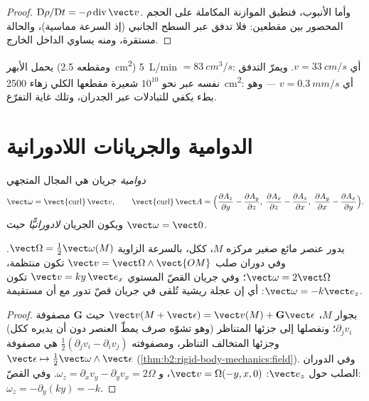 \begin{proof}
$\mathrm D\rho/\mathrm Dt = -\rho\operatorname{div}\vect v$. وأما الأنبوب،
فنطبق الموازنة المكاملة على الحجم المحصور بين مقطعين: فلا تدفق
عبر السطح الجانبي (إذ السرعة مماسية)، والحالة مستقرة، ومنه
يساوي الداخل الخارج.
\end{proof}

\begin{example}[الدم]\label{ex:b2:fluid-kinematics:blood}
يحمل الأبهر (ومقطعه \qty{2.5}{cm^2}) \qty{5}{L/min} $= \qty{83}{cm^3/s}$:
أي $v = \qty{33}{cm/s}$. ويمرّ التدفق نفسه عبر نحو $10^{10}$
شعيرة مقطعها الكلي زهاء \qty{2500}{cm^2}: أي $v = \qty{0.3}{mm/s}$ ---
وهو بطء يكفي للتبادلات عبر الجدران، وتلك غاية التفرّع.
\end{example}

\section{الدوامية والجريانات اللادورانية}

\begin{definition}[الدوامية]\label{def:b2:fluid-kinematics:vorticity}
\emph{دوامية} جريان هي المجال المتجهي
\[
\vect\omega = \operatorname{\vect{curl}}\vect v , \qquad
\operatorname{\vect{curl}}\vect A = \Bigl(\frac{\partial A_z}{\partial y} -
\frac{\partial A_y}{\partial z},\; \frac{\partial A_x}{\partial z} - \frac{\partial A_z}
{\partial x},\; \frac{\partial A_y}{\partial x} - \frac{\partial A_x}{\partial y}\Bigr) .
\]
ويكون الجريان \emph{لادورانيًّا} حيث $\vect\omega = \vect 0$.
\end{definition}

\begin{proposition}\label{prop:b2:fluid-kinematics:rotation}
يدور عنصر مائع صغير مركزه $M$، ككل، بالسرعة الزاوية
$\vect\Omega = \tfrac12\vect\omega(M)$. وفي دوران صلب
$\vect v = \vect\Omega\wedge\vect{OM}$ تكون  منتظمة،
$\vect\omega = 2\vect\Omega$؛ وفي جريان القصّ المستوي $\vect v = ky\,\vect e_x$
تكون $\vect\omega = -k\vect e_z$: أي إن عجلة ريشية تُلقى في جريان
قصّ تدور مع أن  مستقيمة.
\end{proposition}

\begin{proof}
بجوار $M$، $\vect v(M + \vect\epsilon) = \vect v(M) + \mathbf G\vect\epsilon$ حيث
$\mathbf G$ مصفوفة $\partial_jv_i$؛ ونفصلها إلى جزئها المتناظر
(وهو تشوّه صرف يمطّ العنصر دون أن يديره ككل) وجزئها المتخالف
التناظر، ومصفوفته $\tfrac12(\partial_jv_i -
\partial_iv_j)$ هي مصفوفة $\vect\epsilon \mapsto \tfrac12\vect\omega\wedge\vect\epsilon$
(\cref{thm:b2:rigid-body-mechanics:field}). وفي الدوران الصلب حول $\vect e_z$:
$\vect v = \Omega(-y, x, 0)$، و $\omega_z = \partial_xv_y - \partial_yv_x = 2\Omega$.
وفي القصّ: $\omega_z = -\partial_y(ky) = -k$.
\end{proof}

